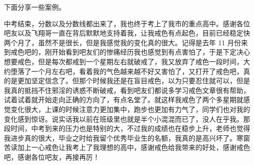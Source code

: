 下面分享一些案例。

\begin{case}
    中考结束，分数以及分数线都出来了，我也终于考上了我市的重点高中。感谢各位吧友以及飞翔哥一直在背后默默地支持着我，让我戒色有点起色，目前已经稳定快两个月了，虽然不是很长，但是我感觉我的变化真的很大。记得是去年 11 月份来到戒色吧的，刚开始看到吧友们的惨痛经历我也感觉到有点害怕了，于是下定决心想要戒色，但是每次都戒到一个星期左右就破戒了，我又放弃了戒色一段时间，大约堕落了一个月左右吧，看着我的气色越来越不好又害怕了，又打开了戒色吧，真的是更加坚定信念了。但那个时候我还是在盲目戒色，以为只要忍住就可以，但是我真的抵挡不住邪淫的诱惑不断破戒，看到吧友们都说多学习戒色文章很有帮助，试着试着就开始走向正确的方向了，有点名堂了。就这样我戒色了两个多星期就感觉变化很大，上课的时候注意力更加集中，跑步也更加有力气了，同学们也对我的变化感到惊讶。说实话我以前在班级里也就是半个小混混而已了，没人在乎我。那段时间，中考到来的压力也是特别的大，不过我的成绩也在稳步上升，老师也觉得我进步真的很大，毕业之时给我留个优秀毕业生的名额，我真的是高兴坏了。寒窗苦读加上一心戒色让我考上了我理想的高中，感谢戒色给我带来的好处，感谢戒色吧，感谢各位吧友，再接再厉！


\end{case}
